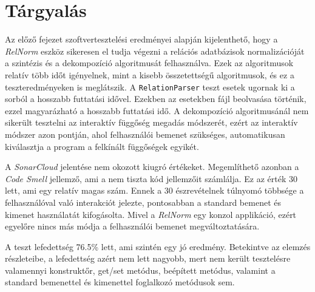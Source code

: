 \chapter{Tárgyalás}

Az előző fejezet szoftvertesztelési eredményei alapján kijelenthető, hogy a \textit{RelNorm} eszköz sikeresen el tudja végezni a relációs adatbázisok normalizációját a szintézis és a dekompozíció algoritmusát felhasználva. Ezek az algoritmusok relatív több időt igényelnek, mint a kisebb összetettségű algoritmusok, és ez a teszteredményeken is meglátszik. A \lstinline{RelationParser} teszt esetek ugornak ki a sorból a hosszabb futtatási idővel. Ezekben az esetekben fájl beolvasása történik, ezzel magyarázható a hosszabb futtatási idő. A dekompozíció algoritmusánál nem sikerült tesztelni az interaktív függőség megadás módszerét, ezért az interaktív módszer azon pontján, ahol felhasználói bemenet szükséges, automatikusan kiválasztja a program a felkínált függőségek egyikét.

A \textit{SonarCloud} jelentése nem okozott kiugró értékeket. Megemlíthető azonban a \textit{Code Smell} jellemző, ami a nem tiszta kód jellemzőit számlálja. Ez az érték 30 lett, ami egy relatív magas szám. Ennek a 30 észrevételnek túlnyomó többsége a felhasználóval való interakciót jelezte, pontosabban a standard bemenet és kimenet használatát kifogásolta. Mivel a \textit{RelNorm} egy konzol applikáció, ezért egyelőre nincs más módja a felhasználói bemenet megváltoztatására.

A teszt lefedettség 76.5\% lett, ami szintén egy jó eredmény. Betekintve az elemzés részleteibe, a lefedettség azért nem lett nagyobb, mert nem került tesztelésre valamennyi konstruktőr, get/set metódus, beépített metódus, valamint a standard bemenettel és kimenettel foglalkozó metódusok sem.

